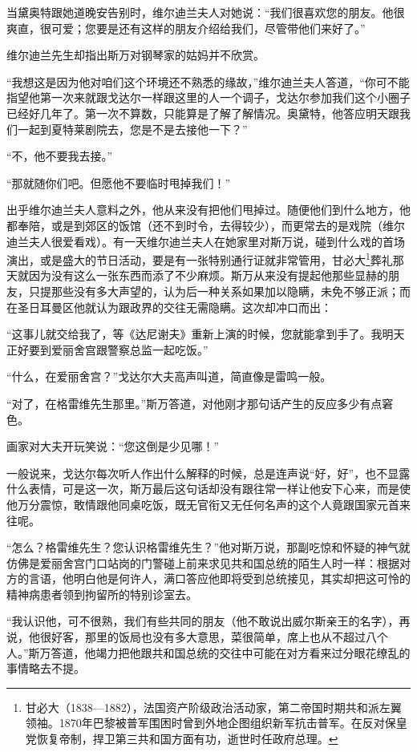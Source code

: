 \par 当黛奥特跟她道晚安告别时，维尔迪兰夫人对她说：“我们很喜欢您的朋友。他很爽直，很可爱；您要是还有这样的朋友介绍给我们，尽管带他们来好了。”
\par 维尔迪兰先生却指出斯万对钢琴家的姑妈并不欣赏。
\par “我想这是因为他对咱们这个环境还不熟悉的缘故，”维尔迪兰夫人答道，“你可不能指望他第一次来就跟戈达尔一样跟这里的人一个调子，戈达尔参加我们这个小圈子已经好几年了。第一次不算数，只能算是了解了解情况。奥黛特，他答应明天跟我们一起到夏特莱剧院去，您是不是去接他一下？”
\par “不，他不要我去接。”
\par “那就随你们吧。但愿他不要临时甩掉我们！”
\par 出乎维尔迪兰夫人意料之外，他从来没有把他们甩掉过。随便他们到什么地方，他都奉陪，或是到郊区的饭馆（还不到时令，去得较少），而更常去的是戏院（维尔迪兰夫人很爱看戏）。有一天维尔迪兰夫人在她家里对斯万说，碰到什么戏的首场演出，或是盛大的节日活动，要是有一张特别通行证就非常管用，甘必大\footnote{甘必大（1838—1882），法国资产阶级政治活动家，第二帝国时期共和派左翼领袖。1870年巴黎被普军围困时曾到外地企图组织新军抗击普军。在反对保皇党恢复帝制，捍卫第三共和国方面有功，逝世时任政府总理。}葬礼那天就因为没有这么一张东西而添了不少麻烦。斯万从来没有提起他那些显赫的朋友，只提那些没有多大声望的，认为后一种关系如果加以隐瞒，未免不够正派；而在圣日耳曼区他就认为跟政界的交往无需隐瞒。这次却冲口而出：
\par “这事儿就交给我了，等《达尼谢夫》重新上演的时候，您就能拿到手了。我明天正好要到爱丽舍宫跟警察总监一起吃饭。”
\par “什么，在爱丽舍宫？”戈达尔大夫高声叫道，简直像是雷鸣一般。
\par “对了，在格雷维先生那里。”斯万答道，对他刚才那句话产生的反应多少有点窘色。
\par 画家对大夫开玩笑说：“您这倒是少见哪！”
\par 一般说来，戈达尔每次听人作出什么解释的时候，总是连声说“好，好”，也不显露什么表情，可是这一次，斯万最后这句话却没有跟往常一样让他安下心来，而是使他万分震惊，敢情跟他同桌吃饭，既无官衔又无任何名声的这个人竟跟国家元首来往呢。
\par “怎么？格雷维先生？您认识格雷维先生？”他对斯万说，那副吃惊和怀疑的神气就仿佛是爱丽舍宫门口站岗的门警碰上前来求见共和国总统的陌生人时一样：根据对方的言语，他明白他是何许人，满口答应他即将受到总统接见，其实却把这可怜的精神病患者领到拘留所的特别诊室去。
\par “我认识他，可不很熟，我们有些共同的朋友（他不敢说出威尔斯亲王的名字），再说，他很好客，那里的饭局也没有多大意思，菜很简单，席上也从不超过八个人。”斯万答道，他竭力把他跟共和国总统的交往中可能在对方看来过分眼花缭乱的事情略去不提。
